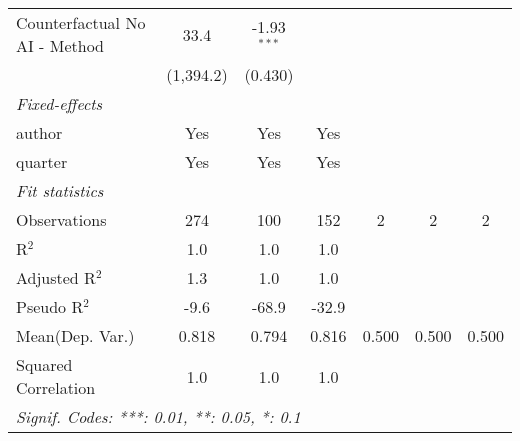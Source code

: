 \begin{tabular}{lcccccc}
   Counterfactual No AI - Method & 33.4           & -1.93$^{***}$ &               &     &     &   \\   
                                 & (1,394.2)      & (0.430)       &               &     &     &   \\   
   \midrule
   \emph{Fixed-effects}\\
   author                        & Yes            & Yes           & Yes           &     &     & \\  
   quarter                       & Yes            & Yes           & Yes           &     &     & \\  
   \midrule
   \emph{Fit statistics}\\
   Observations                  & 274            & 100           & 152           & 2   & 2   & 2\\  
   R$^2$                         & 1.0            & 1.0           & 1.0           &     &     & \\  
   Adjusted R$^2$                & 1.3            & 1.0           & 1.0           &     &     & \\  
   Pseudo R$^2$                  & -9.6           & -68.9         & -32.9         &     &     & \\  
Mean(Dep. Var.) & 0.818 & 0.794 & 0.816 & 0.500 & 0.500 & 0.500 \\
   Squared Correlation           & 1.0            & 1.0           & 1.0           &     &     & \\  
   \midrule \midrule
   \multicolumn{7}{l}{\emph{Signif. Codes: ***: 0.01, **: 0.05, *: 0.1}}\\
\end{tabular}
\par\endgroup
